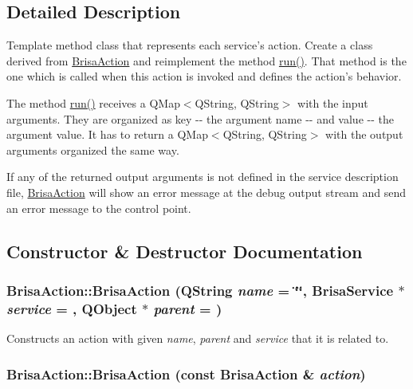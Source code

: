 \subsection{Detailed Description}
Template method class that represents each service's action. Create a class derived from \hyperlink{classBrisaUpnp_1_1BrisaAction}{BrisaAction} and reimplement the method \hyperlink{classBrisaUpnp_1_1BrisaAction_aca2fe8881b0abe570222f31856040424}{run()}. That method is the one which is called when this action is invoked and defines the action's behavior.

The method \hyperlink{classBrisaUpnp_1_1BrisaAction_aca2fe8881b0abe570222f31856040424}{run()} receives a QMap$<$QString, QString$>$ with the input arguments. They are organized as key -\/-\/ the argument name -\/-\/ and value -\/-\/ the argument value. It has to return a QMap$<$QString, QString$>$ with the output arguments organized the same way.

If any of the returned output arguments is not defined in the service description file, \hyperlink{classBrisaUpnp_1_1BrisaAction}{BrisaAction} will show an error message at the debug output stream and send an error message to the control point. 

\subsection{Constructor \& Destructor Documentation}
\hypertarget{classBrisaUpnp_1_1BrisaAction_a34f7d8f1f02c5df7b280e00c0d66b785}{
\subsubsection[{BrisaAction}]{\setlength{\rightskip}{0pt plus 5cm}BrisaAction::BrisaAction (QString {\em name} = {\ttfamily \char`\"{}\char`\"{}}, \/  {\bf BrisaService} $\ast$ {\em service} = {}, \/  QObject $\ast$ {\em parent} = {})}}
\label{classBrisaUpnp_1_1BrisaAction_a34f7d8f1f02c5df7b280e00c0d66b785}


Constructs an action with given {\itshape name\/}, {\itshape parent\/} and {\itshape service\/} that it is related to. \hypertarget{classBrisaUpnp_1_1BrisaAction_ad8222e909463bcfc4257e7da4f5441e8}{
\subsubsection[{BrisaAction}]{\setlength{\rightskip}{0pt plus 5cm}BrisaAction::BrisaAction (const {\bf BrisaAction} \& {\em action})}}
\label{classBrisaUpnp_1_1BrisaAction_ad8222e909463bcfc4257e7da4f5441e8}


